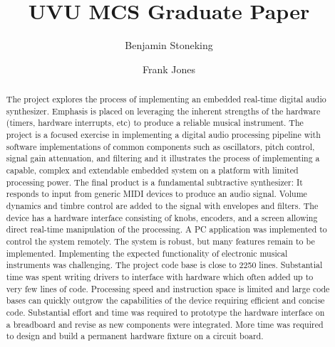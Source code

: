 \documentclass[acmlarge,screen]{acmart}
\begin{document}
\title{UVU MCS Graduate Paper}


\author{Benjamin Stoneking}

\author{Frank Jones}

\renewcommand{\shortauthors}{Candidate First Last}

\begin{abstract}
	The project explores the process of implementing an embedded real-time digital audio synthesizer. Emphasis is placed on leveraging the inherent strengths of the hardware (timers, hardware interrupts, etc) to produce a reliable musical instrument. The project is a focused exercise in implementing a digital audio processing pipeline with software implementations of common components such as oscillators, pitch control, signal gain attenuation, and filtering and it illustrates the process of implementing a capable, complex and extendable embedded system on a platform with limited processing power. The final product is a fundamental subtractive synthesizer: It responds to input from generic MIDI devices to produce an audio signal. Volume dynamics and timbre control are added to the signal with envelopes and filters. The device has a hardware interface consisting of knobs, encoders, and a screen allowing direct real-time manipulation of the processing. A PC application was implemented to control the system remotely. The system is robust, but many features remain to be implemented. Implementing the expected functionality of electronic musical instruments was challenging. The project code base is close to 2250 lines. Substantial time was spent writing drivers to interface with hardware which often added up to very few lines of code. Processing speed and instruction space is limited and large code bases can quickly outgrow the capabilities of the device requiring efficient and concise code. Substantial effort and time was required to prototype the hardware interface on a breadboard and revise as new components were integrated. More time was required to design and build a permanent hardware fixture on a circuit board.
\end{abstract}
\end{document}
